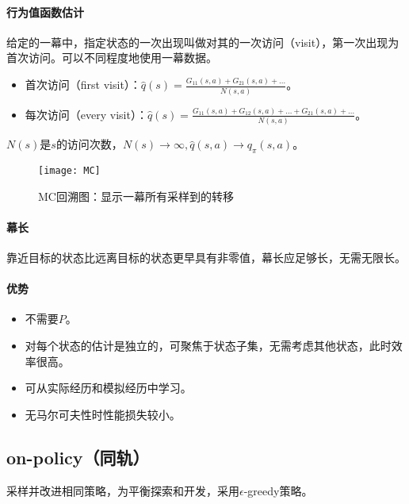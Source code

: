 \documentclass[
12pt, %
a4paper, 
oneside, %
headinclude,footinclude, %
]{scrartcl}
\begin{document}
\paragraph{行为值函数估计}
给定的一幕中，指定状态的一次出现叫做对其的一次访问（visit），第一次出现为首次访问。可以不同程度地使用一幕数据。
\begin{itemize}
\item 首次访问（first visit）：$ \hat{q}(s) = \frac{G_{11}(s, a) + G_{21}(s, a) + \dots}{N(s, a)} $。
\item 每次访问（every visit）：$ \hat{q}(s) = \frac{G_{11}(s, a) + G_{12}(s, a) + \dots + G_{21}(s, a) + \dots}{N(s, a)} $。
\end{itemize}

$ N(s) $是$ s $的访问次数，$ N(s) \to \infty, \hat{q}(s, a) \to q_{\pi}(s, a) $。

\begin{figure}[H]
\centering 
\texttt{[image: MC]} 
\caption[MC回溯图：显示一幕所有采样到的转移]{MC回溯图：显示一幕所有采样到的转移}
\end{figure}
\paragraph{幕长}
靠近目标的状态比远离目标的状态更早具有非零值，幕长应足够长，无需无限长。
\paragraph{优势}
\begin{itemize}
\item 不需要$ P $。
\item 对每个状态的估计是独立的，可聚焦于状态子集，无需考虑其他状态，此时效率很高。
\item 可从实际经历和模拟经历中学习。
\item 无马尔可夫性时性能损失较小。
\end{itemize}
\subsection{on-policy（同轨）}
采样并改进相同策略，为平衡探索和开发，采用$ \epsilon $-greedy策略。
\end{document}
